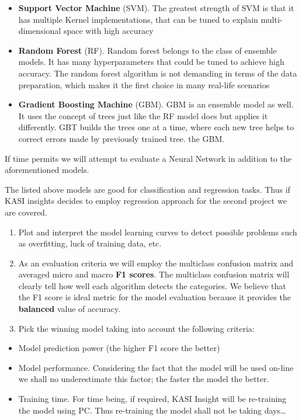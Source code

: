 \begin{itemize}
\tightlist
\item
  \textbf{Support Vector Machine} (SVM). The greatest strength of SVM is
  that it has multiple Kernel implementations, that can be tuned to
  explain multi-dimensional space with high accuracy
\item
  \textbf{Random Forest} (RF). Random forest belongs to the class of
  ensemble models. It has many hyperparameters that could be tuned to
  achieve high accuracy. The random forest algorithm is not demanding in
  terms of the data preparation, which makes it the first choice in many
  real-life scenarios
\item
  \textbf{Gradient Boosting Machine} (GBM). GBM is an ensemble model as
  well. It uses the concept of trees just like the RF model does but
  applies it differently. GBT builds the trees one at a time, where each
  new tree helps to correct errors made by previously trained tree. the
  GBM.
\end{itemize}

If time permits we will attempt to evaluate a Neural Network in addition
to the aforementioned models.

The listed above models are good for classification and regression
tasks. Thus if KASI insights decides to employ regression approach for
the second project we are covered.

\begin{enumerate}
\def\labelenumi{\arabic{enumi}.}
\setcounter{enumi}{1}
\item
  Plot and interpret the model learning curves to detect possible
  problems such as overfitting, luck of training data, etc.
\item
  As an evaluation criteria we will employ the multiclass confusion
  matrix and averaged micro and macro \textbf{F1 scores}. The multiclass
  confusion matrix will clearly tell how well each algorithm detects the
  categories. We believe that the F1 score is ideal metric for the model
  evaluation because it provides the \textbf{balanced} value of
  accuracy.
\item
  Pick the winning model taking into account the following criteria:
\end{enumerate}

\begin{itemize}
\tightlist
\item
  Model prediction power (the higher F1 score the better)
\item
  Model performance. Considering the fact that the model will be used
  on-line we shall no underestimate this factor; the faster the model
  the better.
\item
  Training time. For time being, if required, KASI Insight will be
  re-training the model using PC. Thus re-training the model shall not
  be taking days\ldots{}
\end{itemize}

